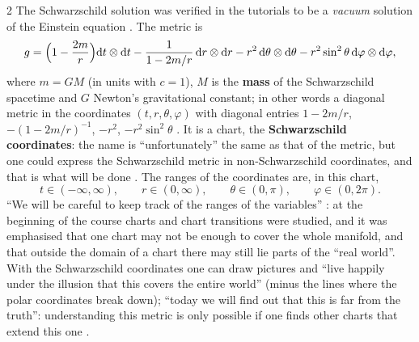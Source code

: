 \begin{paracol}{2}
The Schwarzschild solution was verified in the tutorials to be a \emph{vacuum} solution of the Einstein equation . The metric is
\begin{equation}\label{eq:c22-schw}
  g=\Bigl(1-\frac{2m}{r}\Bigr)\mathrm dt\otimes\mathrm dt-\frac1{1-2m/r}\,\mathrm dr\otimes\mathrm dr-r^2\,\mathrm d\theta\otimes\mathrm d\theta-r^2\sin^2\theta\,\mathrm d\varphi\otimes\mathrm d\varphi,
\end{equation}
where $m=GM$ (in units with $c=1$), $M$ is the \textbf{mass} of the Schwarzschild spacetime and $G$ Newton's gravitational constant; in other words a diagonal metric in the coordinates $(t,r,\theta,\varphi)$ with diagonal entries $1-2m/r$, $-(1-2m/r)^{-1}$, $-r^2$, $-r^2\sin^2\theta$ . It is a chart, the \textbf{Schwarzschild coordinates}: the name is ``unfortunately'' the same as that of the metric, but one could express the Schwarzschild metric in non-Schwarzschild coordinates, and that is what will be done . The ranges of the coordinates are, in this chart,
\[
  t\in(-\infty,\infty),\qquad r\in(0,\infty),\qquad\theta\in(0,\pi),\qquad\varphi\in(0,2\pi).
\]
``We will be careful to keep track of the ranges of the variables'' : at the beginning of the course charts and chart transitions were studied, and it was emphasised that one chart may not be enough to cover the whole manifold, and that outside the domain of a chart there may still lie parts of the ``real world''. With the Schwarzschild coordinates one can draw pictures and ``live happily under the illusion that this covers the entire world'' (minus the lines where the polar coordinates break down); ``today we will find out that this is far from the truth'': understanding this metric is only possible if one finds other charts that extend this one .


\end{paracol}
